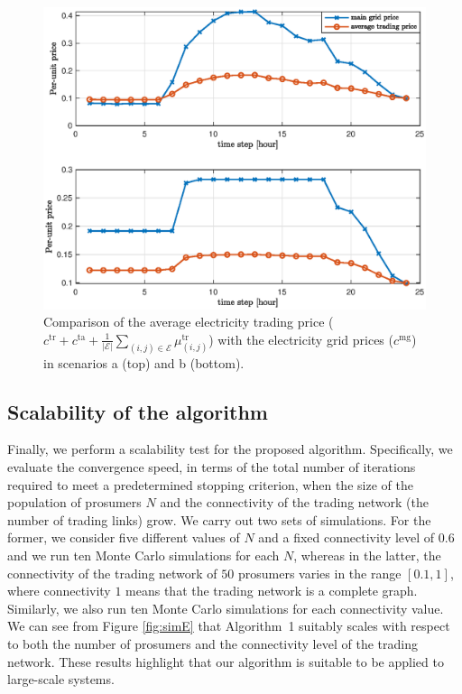 \documentclass{IEEEtran}  %
\newcommand{\mc}{\mathcal}
\newcommand{\0}{\mathbf{0}}
\newcommand{\1}{\mathbf{1}}
\newcommand{\note}[1]{\textcolor{blue}{\texttt{#1}}}
\begin{document}
\begin{figure}[t]
	\centering 
	\marginnote{\note{R3-5}}
	\includegraphics[width=1\linewidth]{figures/simB_0402_pt3_v2}
	\caption{Comparison of the average electricity trading price ($c^{\mathrm{tr}} + c^{\mathrm{ta}} + \tfrac{1}{|\mc E|}\sum_{(i,j)\in \mc E}\mu_{(i,j)}^{\mathrm{tr}}$) with the electricity grid prices ($c^{\mathrm{mg}}$) in scenarios a (top) and b (bottom).
	}
	\label{fig:sim_B3}
\end{figure}  

\subsection{Scalability of the algorithm}
Finally, we perform a scalability test for the proposed algorithm. Specifically, we evaluate the convergence speed, in terms of the total number of iterations required to meet a predetermined stopping criterion, when the size of the population of prosumers $N$ and the connectivity of the trading network (the number of trading links) grow. We carry out two sets of simulations.
%
For the former, we consider five different values of $N$ and a fixed connectivity level of $0.6$ and we run ten Monte Carlo simulations for each $N$, whereas in the latter, the connectivity of the trading network of $50$ prosumers varies in the range $[0.1,1]$, where connectivity $1$ means that the trading network is a complete graph. Similarly, we also run ten Monte Carlo simulations for each connectivity value. We can see from Figure \ref{fig:simE} that Algorithm~1 suitably scales with respect to both the number of prosumers and the connectivity level of the trading network. These results highlight that our algorithm is suitable to be applied to  large-scale systems. 
\end{document}
